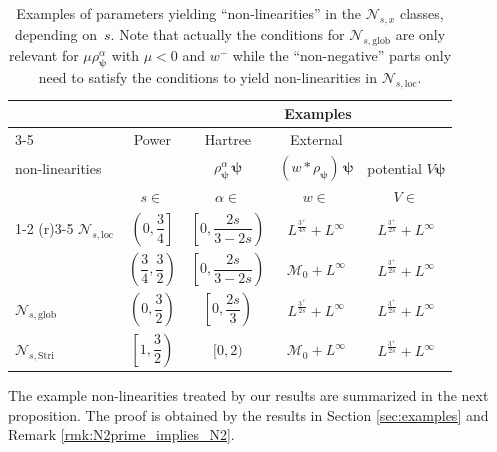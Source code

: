 \documentclass[12pt,a4paper]{amsart}
\numberwithin{equation}{section}
\newcommand{\ulpsi}{\boldsymbol{\psi}}
\newcommand{\Nloc}{\mathscr{N}_{s,\mathrm{loc}}}
\newcommand{\Nglob}{\mathscr{N}_{s,\mathrm{glob}}}
\newcommand{\NStri}{\mathscr{N}_{s,\mathrm{Stri}}}
\begin{document}
	\begin{table}[ht]
		\begin{center}
			\begin{tabular}{@{}lcccc@{}}
				\toprule
				& & \multicolumn{3}{c}{Examples}\\ \cmidrule(r){3-5}
				\multicolumn{2}{l}{Class of} & Power & Hartree & External\tabularnewline
				\multicolumn{2}{l}{non-linearities} & $\rho^\alpha_{\ulpsi} \, \ulpsi $ & $(w * \rho_{\ulpsi})\,\ulpsi $  & potential $V \ulpsi $\\
				& $s\in$ & $\alpha\in$ & $w\in$ & $V\in$\\
				\cmidrule(r){1-2} 
				\cmidrule(r){3-5}
				$\Nloc$ & $\left(0,\dfrac{3}{4}\right]$ & $\left[0,\dfrac{2s}{3-2s}\right)$ & $L^{\frac{3^{+}}{4s}}+L^{\infty}$ & $L^{\frac{3^{+}}{2s}}+L^{\infty}$\\ \addlinespace
				& $\left(\dfrac{3}{4},\dfrac{3}{2}\right)$ &  $\left[0,\dfrac{2s}{3-2s}\right)$ & $\mathcal{M}_{0}+L^{\infty}$ & $L^{\frac{3^{+}}{2s}}+L^{\infty}$\\ \addlinespace
				$\Nglob$ & $\left(0,\dfrac{3}{2}\right)$ & $\left[0,\dfrac{2s}{3}\right)$ & $L^{\frac{3^{+}}{2s}}+L^{\infty}$ & $L^{\frac{3^{+}}{2s}}+L^{\infty}$\\ \addlinespace
				$\NStri$ & $\left[1,\dfrac{3}{2}\right)$ & $[0,2)$ & $\mathcal{M}_{0}+L^{\infty}$ & $L^{\frac{3^{+}}{2s}}+L^{\infty}$\\
				\bottomrule
			\end{tabular}
		\end{center}
		\caption{Examples of parameters yielding ``non-linearities'' in the $\mathscr{N}_{s,x}$ classes, depending on~$s$. Note that actually the conditions for $\Nglob$ are only relevant for $\mu \rho_{\ulpsi}^{\alpha}$ with $\mu<0$ and $w^{-}$ while the ``non-negative'' parts only need to satisfy the conditions to yield non-linearities in $\Nloc$.}
		\label{tab:non-linearities_classes}
	\end{table}
	The example non-linearities treated by our results are summarized in the next proposition. The proof is obtained by the results in Section \ref{sec:examples} and Remark \ref{rmk:N2prime_implies_N2}.
	
\end{document}
